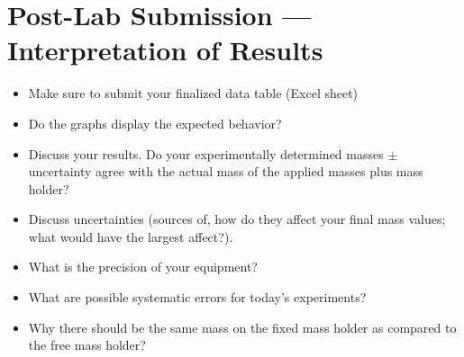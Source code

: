 



\section{Post-Lab Submission --- Interpretation of Results}
\begin{itemize}
\item Make sure to submit your finalized data table (Excel sheet)
\item Do the graphs display the expected behavior?
\item Discuss your results. Do your experimentally determined masses $\pm$ uncertainty agree with the actual mass of the applied masses plus mass holder?
\item Discuss uncertainties (sources of, how do they affect your final mass values; what would have the largest affect?).
\item What is the precision of your equipment?
\item What are possible systematic errors for today's experiments?
\item Why there should be the same mass on the fixed mass holder as compared to the free mass holder?
\end{itemize}






